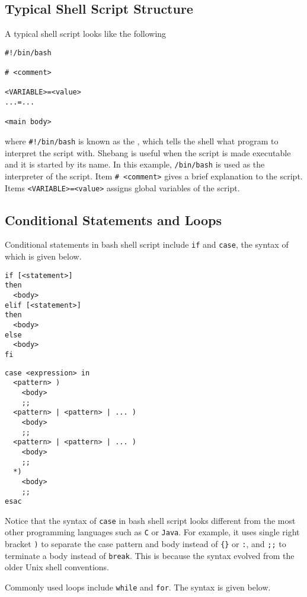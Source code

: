 \subsection{Typical Shell Script Structure}

A typical shell script looks like the following
\begin{lstlisting}
#!/bin/bash

# <comment>

<VARIABLE>=<value>
...=...

<main body>
\end{lstlisting}
where \verb|#!/bin/bash| is known as the , which tells the shell what program to interpret the script with. Shebang is useful when the script is made executable and it is started by its name. In this example, \verb|/bin/bash| is used as the interpreter of the script. Item \verb|# <comment>| gives a brief explanation to the script. Items \verb|<VARIABLE>=<value>| assigns global variables of the script.

\subsection{Conditional Statements and Loops}

Conditional statements in bash shell script include \verb|if| and \verb|case|, the syntax of which is given below.

\begin{lstlisting}
if [<statement>]
then
  <body>
elif [<statement>]
then
  <body>
else
  <body>
fi
\end{lstlisting} 

\begin{lstlisting}
case <expression> in
  <pattern> )
    <body>
    ;;
  <pattern> | <pattern> | ... )
    <body>
    ;;
  <pattern> | <pattern> | ... )
    <body>
    ;;
  *)
    <body>
    ;;
esac
\end{lstlisting}

Notice that the syntax of \verb|case| in bash shell script looks different from the most other programming languages such as \verb|C| or \verb|Java|. For example, it uses single right bracket \verb|)| to separate the case pattern and body instead of \verb|{}| or \verb|:|, and \verb|;;| to terminate a body instead of \verb|break|. This is because the syntax evolved from the older Unix shell conventions.

Commonly used loops include \verb|while| and \verb|for|. The syntax is given below.

